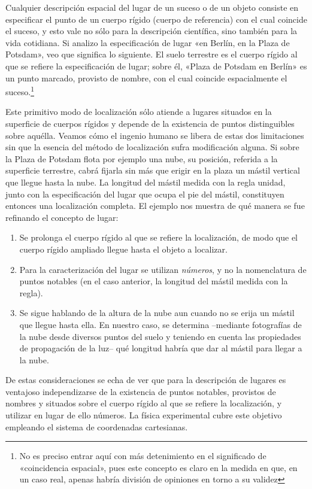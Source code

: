 \documentclass[spanish]{book}
\begin{document}
Cualquier descripción espacial del lugar de un suceso o de un objeto consiste en
especificar el punto de un cuerpo rígido (cuerpo de referencia) con el cual coincide el
suceso, y esto vale no sólo para la descripción científica, sino también para la vida
cotidiana. Si analizo la especificación de lugar «en Berlín, en la Plaza de Potsdam», veo
que significa lo siguiente. El suelo terrestre es el cuerpo rígido al que se refiere la
especificación de lugar; sobre él, «Plaza de Potsdam en Berlín» es un punto
marcado, provisto de nombre, con el cual coincide espacialmente el suceso.\footnote{
No es preciso entrar aquí con más detenimiento en el significado de «coincidencia 
espacial», pues este concepto es claro en la medida en que, en un caso real, 
apenas habría división de opiniones en torno a su validez}

  Este primitivo modo de localización sólo atiende a lugares situados en la superficie
de cuerpos rígidos y depende de la existencia de puntos distinguibles sobre aquélla.
Veamos cómo el ingenio humano se libera de estas dos limitaciones sin que la esencia
del método de localización sufra modificación alguna. Si sobre la Plaza de Potsdam flota
por ejemplo una nube, su posición, referida a la superficie terrestre, cabrá fijarla sin
más que erigir en la plaza un mástil vertical que llegue hasta la nube. La longitud del
mástil medida con la regla unidad, junto con la especificación del lugar que ocupa el
pie del mástil, constituyen entonces una localización completa. El ejemplo nos
muestra de qué manera se fue refinando el concepto de lugar:
\begin{enumerate}
\item Se prolonga el cuerpo rígido al que se refiere la localización, de modo que el
cuerpo rígido ampliado llegue hasta el objeto a localizar.
\item Para la caracterización del lugar se utilizan \textit{números}, y no la nomenclatura de
puntos notables (en el caso anterior, la longitud del mástil medida con la regla).
\item Se sigue hablando de la altura de la nube aun cuando no se erija un mástil
que llegue hasta ella. En nuestro caso, se determina --mediante fotografías de la nube
desde diversos puntos del suelo y teniendo en cuenta las propiedades de
propagación de la luz-- qué longitud habría que dar al mástil para llegar a la nube.
\end{enumerate}

De estas consideraciones se echa de ver que para la descripción de lugares es
ventajoso independizarse de la existencia de puntos notables, provistos de nombres y
situados sobre el cuerpo rígido al que se refiere la localización, y utilizar en lugar de
ello números. La física experimental cubre este objetivo empleando el sistema de
coordenadas cartesianas.
\end{document}
